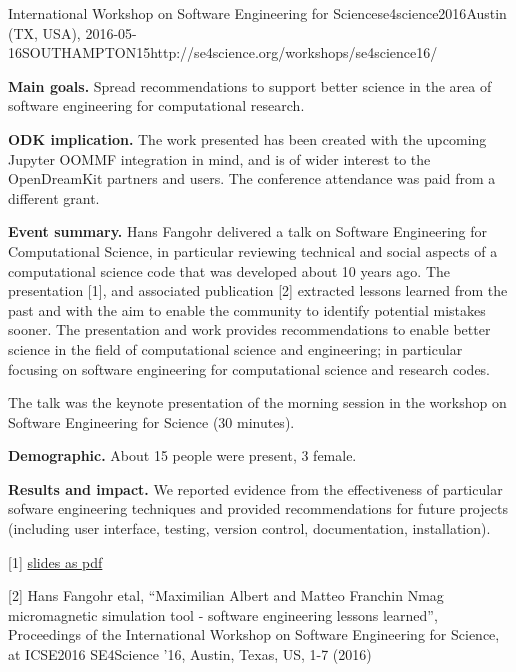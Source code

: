 \begin{event}{International Workshop on Software Engineering for
    Science}{se4science2016}{Austin (TX, USA),
    2016-05-16}{SOUTHAMPTON}{15}{http://se4science.org/workshops/se4science16/}

  \textbf{Main goals.} Spread recommendations to support better
  science in the area of software engineering for computational research.

  \textbf{ODK implication.} The work presented has been created with
  the upcoming Jupyter OOMMF integration in mind, and is of wider
  interest to the OpenDreamKit partners and users. The conference
  attendance was paid from a different grant.

  \textbf{Event summary.} Hans Fangohr delivered a talk on Software
  Engineering for Computational Science, in particular reviewing
  technical and social aspects of a computational science code that
  was developed about 10 years ago. The presentation [1], and associated
  publication [2] extracted lessons learned from the past and with the aim
  to enable the community to identify potential mistakes sooner. The
  presentation and work provides recommendations to enable better
  science in the field of computational science and engineering; in
  particular focusing on software engineering for computational
  science and research codes.

  The talk was the keynote presentation of the morning session in the
  workshop on Software Engineering for Science (30 minutes).

  \textbf{Demographic.} About 15 people were present, 3 female.

  \textbf{Results and impact.} We reported evidence from the
  effectiveness of particular sofware engineering techniques and
  provided recommendations for future projects (including user
  interface, testing, version control, documentation,
  installation).

  [1]
  \href{http://www.southampton.ac.uk/~fangohr/publications/talk/2016-05-16-ICSE-SE4Science-Austin-Texas-US.pdf}
  {slides as pdf}

  [2] Hans Fangohr etal, ``Maximilian Albert and Matteo Franchin Nmag
  micromagnetic simulation tool - software engineering lessons
  learned'', Proceedings of the International Workshop on Software
  Engineering for Science, at ICSE2016 SE4Science '16, Austin, Texas,
  US, 1-7 (2016)


\end{event}
